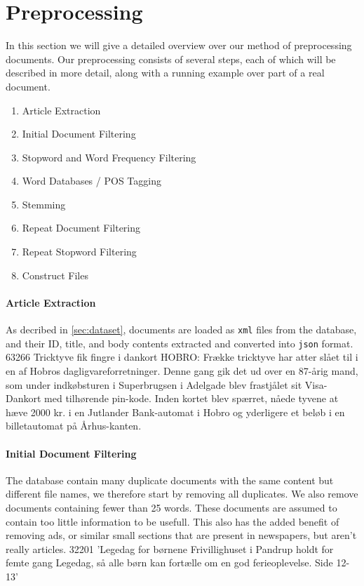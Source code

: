 \section{Preprocessing}\label{sec:prepro}

In this section we will give a detailed overview over our method of preprocessing documents.
Our preprocessing consists of several steps, each of which will be described in more detail, along with a running example over part of a real document.
\begin{enumerate}[label=\alph*]
	\item Article Extraction
	\item Initial Document Filtering
	\item Stopword and Word Frequency Filtering
	\item Word Databases / POS Tagging
	\item Stemming
	\item Repeat Document Filtering
	\item Repeat Stopword Filtering
	\item Construct Files
\end{enumerate}

\paragraph{Article Extraction}
As decribed in \autoref{sec:dataset}, documents are loaded as \texttt{xml} files from the database, and their ID, title, and body contents extracted and converted into \texttt{json} format.
63266
Tricktyve fik fingre i dankort HOBRO: Frække tricktyve har atter slået til i en af Hobros dagligvareforretninger. Denne gang gik det ud over en 87-årig mand, som under indkøbsturen i Superbrugsen i Adelgade blev frastjålet sit Visa-Dankort med tilhørende pin-kode. Inden kortet blev spærret, nåede tyvene at hæve 2000 kr. i en Jutlander Bank-automat i Hobro og yderligere et beløb i en billetautomat på Århus-kanten. 

\paragraph{Initial Document Filtering}
The database contain many duplicate documents with the same content but different file names, we therefore start by removing all duplicates.
We also remove documents containing fewer than 25 words. These documents are assumed to contain too little information to be usefull. This also has the added benefit of removing ads, or similar small sections that are present in newspapers, but aren't really articles.
32201
'Legedag for børnene Frivillighuset i Pandrup holdt for femte gang Legedag, så alle børn kan fortælle om en god ferieoplevelse. Side 12-13'

